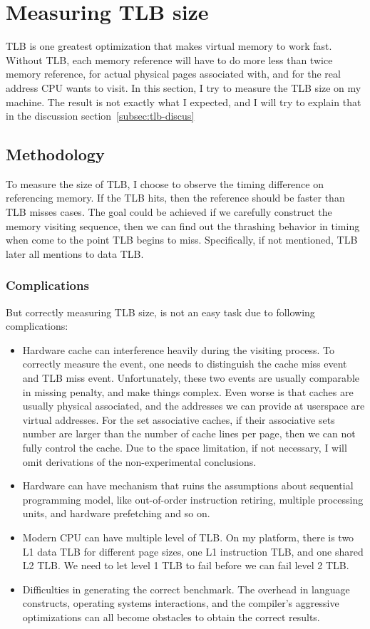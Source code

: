 \section{Measuring TLB size}
	\label{sec:tlb}
TLB is one greatest optimization that makes virtual memory to work fast.
Without TLB, each memory reference will have to do more less than twice memory
reference, for actual physical pages associated with, and for the real address
CPU wants to visit. In this section, I try to measure the TLB size on my
machine. The result is not exactly what I expected, and I will try to explain that in the discussion section~\ref{subsec:tlb-discus}

\subsection{Methodology}
To measure the size of TLB, I choose to observe the timing difference on referencing
memory. If the TLB hits, then the reference should be faster than TLB misses
cases. The goal could be achieved if we carefully construct the memory visiting
sequence, then we can find out the thrashing behavior in timing when come to the
point TLB begins to miss. Specifically, if not mentioned, TLB later all
mentions to data TLB.

\subsubsection{Complications}
But correctly measuring TLB size, is not an easy task due to following complications:

\begin{itemize}
\item Hardware cache can interference heavily during the visiting process. To
correctly measure the event, one needs to distinguish the cache miss event and
TLB miss event. Unfortunately, these two events are usually comparable in missing
penalty, and make things complex. Even worse is that caches are usually physical
associated, and the addresses we can provide at userspace are virtual addresses.
For the set associative caches, if their associative sets number are larger than
the number of cache lines per page, then we can not fully control the cache. Due
to the space limitation, if not necessary, I will omit derivations of the
non-experimental conclusions.
\item Hardware can have mechanism that ruins the assumptions about sequential
programming model, like out-of-order instruction retiring, multiple processing
units, and hardware prefetching and so on.
\item Modern CPU can have multiple level of TLB. On my platform, there is two
L1 data TLB for different page sizes, one L1 instruction TLB, and one shared L2
TLB. We need to let level 1 TLB to fail before we can fail level 2 TLB.
\item Difficulties in generating the correct benchmark. The overhead in
language constructs, operating systems interactions, and the compiler's
aggressive optimizations can all become obstacles to obtain the correct results.
\end{itemize}

